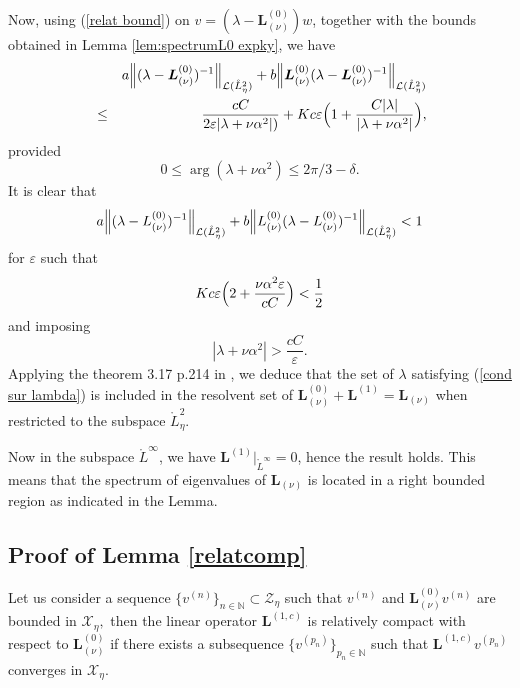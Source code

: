 \documentclass[11pt]{article}
\begin{document}
Now, using (\ref{relat bound}) on $v = (\lambda - \boldsymbol{L}^{(0)}_{(\nu)}) w$,
together with the bounds obtained in Lemma \ref{lem:spectrumL0 expky}, we have%
\begin{eqnarray*}
&&a\Bigl\|(\lambda -\boldsymbol{L}_{(\nu )}^{(0)})^{-1} \Bigr\|_{\mathcal{L}(\mathring{L}%
_{\eta}^{2})}+b \Bigl\| \boldsymbol{L}_{(\nu )}^{(0)}(\lambda -\boldsymbol{L}_{(\nu )}^{(0)})^{-1} \Bigr\|_{\mathcal{L}%
(\mathring{L}_{\eta}^{2})} \\
&\leq &\frac{cC}{2\varepsilon |\lambda +\nu \alpha ^{2}|)}+Kc\varepsilon \Bigl(1+%
\frac{C|\lambda |}{|\lambda +\nu \alpha ^{2}|} \Bigr),
\end{eqnarray*}%
provided 
\begin{equation*}
0\leq \arg (\lambda +\nu \alpha ^{2})\leq 2\pi /3-\delta.
\end{equation*}%
It is clear that 
\begin{equation*}
a \Bigl\|(\lambda -L_{(\nu )}^{(0)})^{-1} \Bigr\|_{\mathcal{L}(\mathring{L}%
_{\eta}^{2})}+b \Bigl\|L_{(\nu )}^{(0)}(\lambda -L_{(\nu )}^{(0)})^{-1} \Bigr\|_{\mathcal{L}%
(\mathring{L}_{\eta}^{2})}<1
\end{equation*}%
for $\varepsilon $ such that 
$$
Kc\varepsilon \Bigl( 2+\frac{\nu\alpha^{2}\varepsilon }{cC} \Bigr) < \frac{1}{2}
$$
and imposing
\begin{equation}
|\lambda +\nu \alpha ^{2}|> \frac{cC}{\varepsilon}.  \label{cond sur lambda}
\end{equation}%
Applying the theorem 3.17 p.214 in \cite{Kato}, we deduce that the set of $%
\lambda $ satisfying (\ref{cond sur lambda}) is included in the resolvent
set of $\boldsymbol{L}_{(\nu )}^{(0)}+\boldsymbol{L}^{(1)}=\boldsymbol{L}%
_{(\nu )}$ when restricted to the subspace $\mathring{L}_{\eta}^{2}.$

Now in the subspace $\mathring{L}^{\infty }$, we have $\boldsymbol{L}%
^{(1)}|_{\mathring{L}^{\infty }}=0$, hence the result holds.
This means that the spectrum of eigenvalues of $\boldsymbol{L}_{(\nu )}$ is
located in a right bounded region as indicated in the Lemma. 



\subsection{Proof of Lemma \protect\ref{relatcomp}}



\label{proof4} Let us consider a sequence $\{v^{(n)}\}_{n\in \mathbb{N}%
}\subset \mathcal{Z}_{\eta}$ such that $v^{(n)}$ and $\boldsymbol{L}_{(\nu
)}^{(0)}v^{(n)}$ are bounded in $\mathcal{X}_{\eta},$ then the linear operator $%
\boldsymbol{L}^{(1,c)}$ is relatively compact with respect to $\boldsymbol{L}%
_{(\nu )}^{(0)}$ if there exists a subsequence $\{v^{(p_{n})}\}_{p_{n}\in 
\mathbb{N}}$ such that $\boldsymbol{L}^{(1,c)}v^{(p_{n})}$ converges in $%
\mathcal{X}_{\eta}.$
\end{document}
